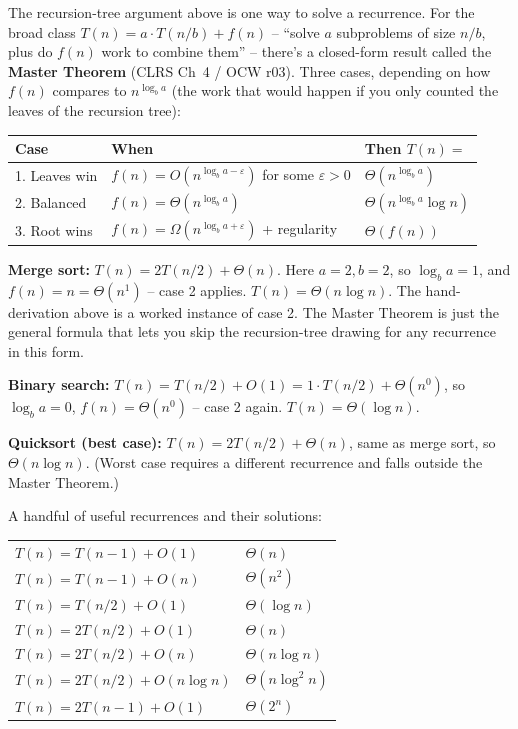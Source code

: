 \documentclass[11pt]{article}
\begin{document}
\begin{notebox}
The recursion-tree argument above is one way to solve a recurrence.
For the broad class $T(n) = a \cdot T(n/b) + f(n)$ -- ``solve $a$
subproblems of size $n/b$, plus do $f(n)$ work to combine them'' --
there's a closed-form result called the \textbf{Master Theorem}
(CLRS Ch~4 / OCW r03). Three cases, depending on how $f(n)$
compares to $n^{\log_b a}$ (the work that would happen if you only
counted the leaves of the recursion tree):

\begin{center}
\small
\begin{tabular}{@{}p{2.6cm}p{4.0cm}p{5.0cm}@{}}
\textbf{Case} & \textbf{When} & \textbf{Then $T(n) =$} \\
\hline
1. Leaves win  & $f(n) = O(n^{\log_b a - \varepsilon})$ for some $\varepsilon > 0$ & $\Theta(n^{\log_b a})$ \\
2. Balanced    & $f(n) = \Theta(n^{\log_b a})$                                     & $\Theta(n^{\log_b a} \log n)$ \\
3. Root wins   & $f(n) = \Omega(n^{\log_b a + \varepsilon})$ + regularity         & $\Theta(f(n))$ \\
\end{tabular}
\normalsize
\end{center}

\textbf{Merge sort:} $T(n) = 2T(n/2) + \Theta(n)$. Here $a=2, b=2$,
so $\log_b a = 1$, and $f(n) = n = \Theta(n^1)$ -- case 2 applies.
$T(n) = \Theta(n \log n)$. The hand-derivation above is a worked
instance of case 2. The Master Theorem is just the general formula
that lets you skip the recursion-tree drawing for any recurrence in
this form.

\textbf{Binary search:} $T(n) = T(n/2) + O(1) = 1 \cdot T(n/2) +
\Theta(n^0)$, so $\log_b a = 0$, $f(n) = \Theta(n^0)$ -- case 2
again. $T(n) = \Theta(\log n)$.

\textbf{Quicksort (best case):} $T(n) = 2T(n/2) + \Theta(n)$, same
as merge sort, so $\Theta(n \log n)$. (Worst case requires a
different recurrence and falls outside the Master Theorem.)

A handful of useful recurrences and their solutions:

\begin{center}
\small
\begin{tabular}{@{}ll@{}}
$T(n) = T(n - 1) + O(1)$        & $\Theta(n)$ \\
$T(n) = T(n - 1) + O(n)$        & $\Theta(n^2)$ \\
$T(n) = T(n/2) + O(1)$          & $\Theta(\log n)$ \\
$T(n) = 2T(n/2) + O(1)$         & $\Theta(n)$ \\
$T(n) = 2T(n/2) + O(n)$         & $\Theta(n \log n)$ \\
$T(n) = 2T(n/2) + O(n \log n)$  & $\Theta(n \log^2 n)$ \\
$T(n) = 2T(n - 1) + O(1)$       & $\Theta(2^n)$ \\
\end{tabular}
\normalsize
\end{center}


\end{notebox}
\end{document}
